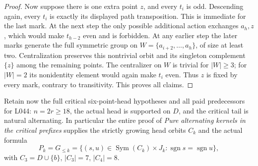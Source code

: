 \documentclass[11pt,a4paper]{article}
\newcommand{\Sym}{\operatorname{Sym}}
\begin{document}
\begin{proof}
Now suppose there is one extra point $z$, and every $t_i$ is
odd. Descending again, every $t_i$ is exactly its displayed
path transposition. This is immediate for the last mark.
At the next step the only possible additional action exchanges
$a_h,z$, which would make $t_{h-2}$ even and is forbidden.
At any earlier step the later marks generate the full symmetric
group on $W=\{a_{i+2},\ldots,a_h\}$, of size at least two.
Centralization preserves this nontrivial orbit and its singleton
complement $\{z\}$ among the remaining points. The centralizer
on $W$ is trivial for $|W|\geq3$; for $|W|=2$ its nonidentity
element would again make $t_i$ even. Thus $z$ is fixed by every
mark, contrary to transitivity. This proves all claims.
\end{proof}

Retain now the full critical six-point-head hypotheses and all
paid predecessors for L044: $n=2r\geq18$, the actual head is
supported on $D$, and the critical tail is natural alternating.
In particular the entire proof of
\emph{Pure alternating kernels in the critical prefixes} supplies
the strictly growing head orbits $C_k$ and the actual formula
\[
 P_k=G_{\leq k}
 =\{(s,u)\in\Sym(C_k)\times J_k:
                          \operatorname{sgn}s=\operatorname{sgn}u\},
                                                        \tag{3}
\]
with $C_3=D\cup\{b\}$, $|C_3|=7$, $|C_4|=8$.
\end{document}
